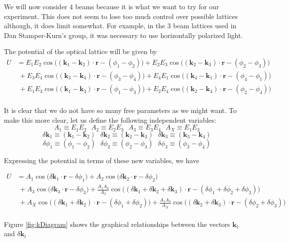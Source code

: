 \documentclass[11pt]{article}
\newcommand{\eq}[1]{\begin{equation*} \begin{split}   #1  \end{split} \end{equation*}}
\newcommand{\de}{\delta}
\newcommand{\ph}{\phi}
\newcommand{\vk}{\mathbf{k}}
\newcommand{\vr}{\mathbf{r}}
\begin{document}
We will now consider 4 beams because it is what we want to try for our experiment.  This does not seem to lose too much control over possible lattices although, it does limit somewhat.  For example, in the 3 beam lattices used in Dan Stamper-Kurn's group, it was necessary to use horizontally polarized light.

The potential of the optical lattice will be given by
\begin{equation}
\begin{split}
U &= E_{1}E_{2} \cos\Big((\vk_1-\vk_2) \cdot \vr - (\ph_1-\ph_2)\Big) + E_{2}E_{3} \cos\Big((\vk_2-\vk_3) \cdot \vr - (\ph_2-\ph_3)\Big)\\[1.4ex] 
&\;+E_{3}E_{4} \cos\Big((\vk_3-\vk_4) \cdot \vr - (\ph_3-\ph_4)\Big)+E_{4}E_{1} \cos\Big((\vk_4-\vk_1) \cdot \vr - (\ph_4-\ph_1)\Big)  \\[1.4ex]
&\;+E_{1}E_{3} \cos\Big((\vk_1-\vk_3) \cdot \vr - (\ph_1-\ph_3)\Big)+E_{2}E_{4} \cos\Big((\vk_2-\vk_4) \cdot \vr - (\ph_2-\ph_4)\Big) \\[1.4ex]
\label{FullPotentialU}
\end{split}
\end{equation}

It is clear that we do not have so many free parameters as we might want.  To make this more clear, let us define the following independent variables: 
\[
A_1 \equiv E_{1}E_{2} \ \ \ A_2 \equiv E_{2}E_{3} \ \ \ A_3 \equiv E_{3}E_{4} \ \ \ A_X \equiv E_{1}E_{3}
\]
\[
\de \vk_1 \equiv (\vk_1-\vk_2) \ \ \ \de \vk_2 \equiv (\vk_2-\vk_3) \ \ \ \de \vk_3 \equiv (\vk_3-\vk_4)
\]
\[
\de \ph_1 \equiv (\ph_1-\ph_2) \ \ \ \de \ph_2 \equiv (\ph_2-\ph_3) \ \ \ \de \ph_3 \equiv (\ph_3-\ph_4)
\]

Expressing the potential in terms of these new variables, we have

\eq{
U &= A_1\cos\Big(\de \vk_1 \cdot \vr - \de \ph_1\Big) + A_2 \cos\Big(\de \vk_2 \cdot \vr - \de \ph_2\Big)\\[1.4ex] 
&\;+ A_3 \cos\Big(\de \vk_3 \cdot \vr - \de \ph_3\Big)+ \frac{A_1 A_3}{A_2}  \cos\Big((\de \vk_1 +\de \vk_2 +\de \vk_3)\cdot \vr - (\de \ph_1 +\de \ph_2 +\de \ph_3)\Big)  \\[1.4ex]
&\;+ A_X\cos\Big((\de \vk_1+\de \vk_2) \cdot \vr - (\de\ph_1+\de\ph_2)\Big)+ \frac{A_1A_3}{A_X}\cos\Big((\de \vk_2+\de\vk_3) \cdot \vr - (\de \ph_2 + \de \ph_3)\Big) \\[1.4ex]
}

Figure \ref{fig:kDiagram} shows the graphical relationships between the vectors $\vk_l$ and $\de\vk_l$
\end{document}
